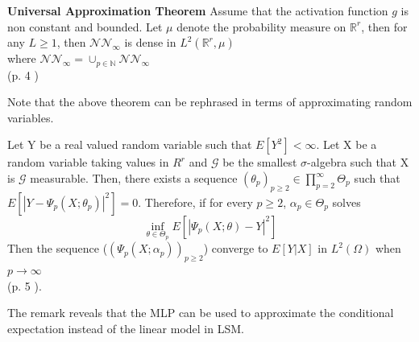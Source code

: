 \begin{theorem}\label{UniversalApproxTheorem}
\textbf{Universal Approximation Theorem} Assume that the activation function $g$ is non constant and bounded. Let $\mu$ denote the probability measure on $\mathbb{R}^r$, then for any $L\geq 1$, then $\mathcal{N} \mathcal{N}_\infty$ is dense in $L^2(\mathbb{R}^r, \mu)$\\
where $\mathcal{N} \mathcal{N}_\infty= \cup_{p\in \mathbb{N}} \mathcal{N} \mathcal{N}_\infty$\\
\null \hfill (p. 4 \parencite{Lelong19})
\end{theorem}
Note that the above theorem can be rephrased in terms of approximating random variables.
\begin{remark}
Let Y be a real valued random variable such that $E[Y^2]< \infty$. Let X be a random variable taking values in $R^r$ and $\mathcal{G}$ be the smallest $\sigma$-algebra such that X is $\mathcal{G}$ measurable. Then, there exists a sequence $(\theta_p)_{p\geq 2} \in \prod_{p=2}^{\infty} \Theta_{p}$ such that $E[|Y-\Psi_p(X;\theta_p)|^2]=0$. Therefore, if for every $p \geq 2$, $\alpha_p \in \Theta_p$ solves
$$\inf_{\theta\in \Theta_p} E[|\Psi_p(X;\theta)-Y|^2]$$
Then the sequence ($(\Psi_p(X;\alpha_p))_{p\geq 2}$) converge to $E[Y|X]$ in $L^2(\Omega)$ when $p \to \infty$ \\
\null \hfill (p. 5 \parencite{Lelong19}).
\end{remark}
The remark reveals that the MLP can be used to approximate the conditional expectation instead of the linear model in LSM.

